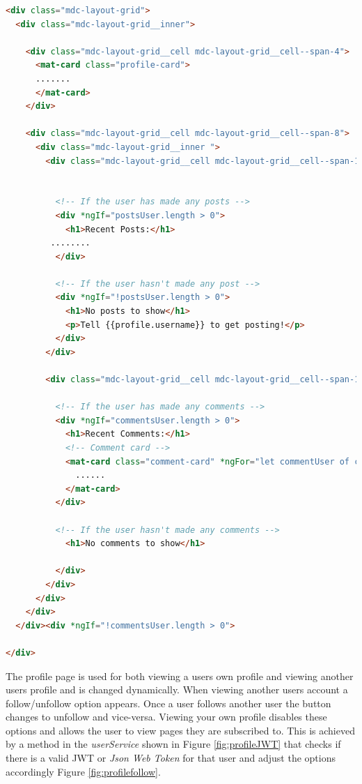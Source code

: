 \begin{lstlisting}[language=HTML,caption={Angular Material Component Grid},captionpos=b,label={fig:profileHTML}]
<div class="mdc-layout-grid">
  <div class="mdc-layout-grid__inner">

    <div class="mdc-layout-grid__cell mdc-layout-grid__cell--span-4">
      <mat-card class="profile-card">
      .......
      </mat-card>
    </div>

    <div class="mdc-layout-grid__cell mdc-layout-grid__cell--span-8">
      <div class="mdc-layout-grid__inner ">
        <div class="mdc-layout-grid__cell mdc-layout-grid__cell--span-12">


          <!-- If the user has made any posts -->
          <div *ngIf="postsUser.length > 0">
            <h1>Recent Posts:</h1>
         ........
          </div>

          <!-- If the user hasn't made any post -->
          <div *ngIf="!postsUser.length > 0">
            <h1>No posts to show</h1>
            <p>Tell {{profile.username}} to get posting!</p>
          </div>
        </div>
        
        <div class="mdc-layout-grid__cell mdc-layout-grid__cell--span-12">

          <!-- If the user has made any comments -->
          <div *ngIf="commentsUser.length > 0">
            <h1>Recent Comments:</h1>
            <!-- Comment card -->
            <mat-card class="comment-card" *ngFor="let commentUser of commentsUser">
              ......
            </mat-card>
          </div>

          <!-- If the user hasn't made any comments -->
            <h1>No comments to show</h1>

          </div>
        </div>
      </div>
    </div>
  </div><div *ngIf="!commentsUser.length > 0">
          
</div>
\end{lstlisting}

The profile page is used for both viewing a users own profile and viewing another users profile and is changed dynamically. When viewing another users account a follow/unfollow option appears. Once a user follows another user the button changes to unfollow and vice-versa. Viewing your own profile disables these options and allows the user to view pages they are subscribed to. This is achieved by a method in the \textit{userService} shown in Figure \ref{fig:profileJWT} that checks if there is a valid JWT or \textit{Json Web Token} for that user and adjust the options accordingly Figure \ref{fig:profilefollow}.

